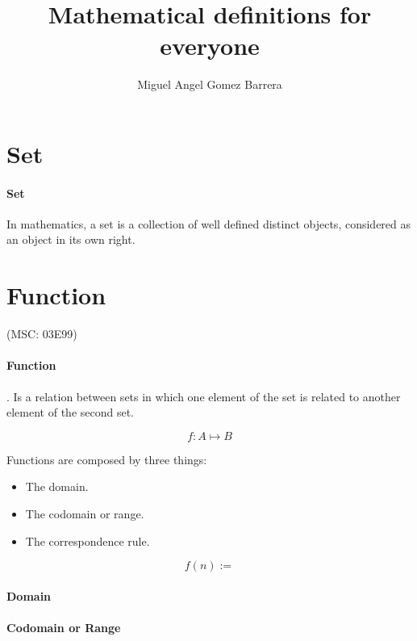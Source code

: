 \documentclass{article}
\begin{document}
\title{Mathematical definitions for everyone}
\author{Miguel Angel Gomez Barrera}

\maketitle

\section{Set}

\paragraph{Set} In mathematics, a set is a collection of well defined distinct objects, considered as an object in its own right.

\section{Function}
(MSC: 03E99)
\paragraph{Function} . Is a relation between sets in which one element of the set is related to another element of the second set.

$$f: A \mapsto B$$

Functions are composed by three things:

\begin{itemize}
    \item The domain.
    \item The codomain or range.
    \item The correspondence rule.
\end{itemize}

$$f(n):=$$

\paragraph{Domain}
\paragraph{Codomain or Range}
\end{document}
